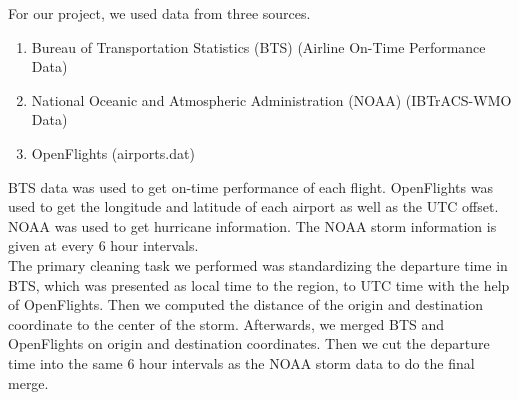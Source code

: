 
For our project, we used data from three sources.  
\begin{enumerate}
\item Bureau of Transportation Statistics (BTS) (Airline On-Time Performance Data) 
\item National Oceanic and Atmospheric Administration (NOAA) (IBTrACS-WMO Data)
\item OpenFlights (airports.dat)
\end{enumerate}

BTS data was used to get on-time performance of each flight. OpenFlights was used to get the longitude and latitude of each airport as well as the UTC offset. NOAA was used to get hurricane information. The NOAA storm information is given at every 6 hour intervals. \\

The primary cleaning task we performed was standardizing the departure time in BTS, which was presented as local time to the region, to UTC time with the help of OpenFlights. Then we computed the distance of the origin and destination coordinate to the center of the storm. Afterwards, we merged BTS and OpenFlights on origin and destination coordinates. Then we cut the departure time into the same 6 hour intervals as the NOAA storm data to do the final merge.

